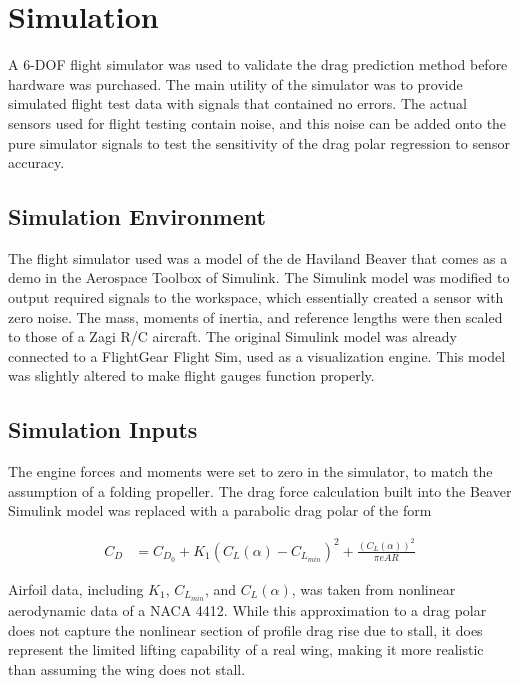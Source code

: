 \section{Simulation}
\label{simulation}
A 6-DOF flight simulator was used to validate the drag prediction method before hardware was purchased. The main utility of the simulator was to provide simulated flight test data with signals that contained no errors. The actual sensors used for flight testing contain noise, and this noise can be added onto the pure simulator signals to test the sensitivity of the drag polar regression to sensor accuracy.

\subsection*{Simulation Environment}
The flight simulator used was a model of the de Haviland Beaver that comes as a demo in the Aerospace Toolbox of Simulink. The Simulink model was modified to output required signals to the workspace, which essentially created a sensor with zero noise. The mass, moments of inertia, and reference lengths were then scaled to those of a Zagi R/C aircraft\cite{stevens2003aircraft}. The original Simulink model was already connected to a FlightGear Flight Sim, used as a visualization engine. This model was slightly altered to make flight gauges function properly.

\subsection*{Simulation Inputs}
The engine forces and moments were set to zero in the simulator, to match the assumption of a folding propeller.
The drag force calculation built into the Beaver Simulink model was replaced with a parabolic drag polar of the form

\begin{align}
C_D &= C_{D_0} + K_1(C_L(\alpha)-C_{L_{min}})^2+\frac{(C_L(\alpha))^2}{\pi eAR}
\end{align}

Airfoil data, including $K_1$, $C_{L_{min}}$, and $C_L(\alpha)$, was taken from nonlinear aerodynamic data of a NACA 4412. While this approximation to a drag polar does not capture the nonlinear section of profile drag rise due to stall, it does represent the limited lifting capability of a real wing, making it more realistic than assuming the wing does not stall.
